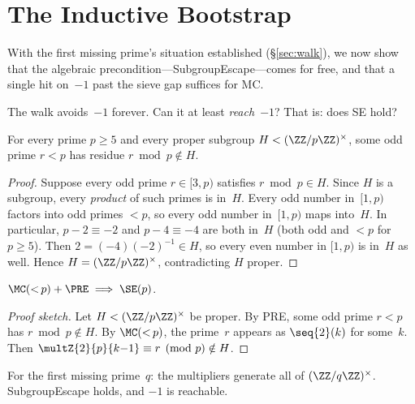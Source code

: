 \section{The Inductive Bootstrap}
\label{sec:bootstrap}

With the first missing prime's situation established (\S\ref{sec:walk}), we now show that the algebraic precondition---SubgroupEscape---comes for free, and that a single hit on~$-1$ past the sieve gap suffices for MC\@.

The walk avoids~$-1$ forever.  Can it at least \emph{reach}~$-1$?
That is: does SE hold?

\begin{theorem}\label{thm:pre}
For every prime $p \geq 5$ and every proper subgroup
$H < (\ZZ/p\ZZ)^\times$, some odd prime $r < p$ has residue
$r \bmod p \notin H$.
\end{theorem}

\begin{proof}
Suppose every odd prime $r \in [3, p)$ satisfies $r \bmod p \in H$.
Since $H$ is a subgroup, every \emph{product} of such primes is
in~$H$.  Every odd number in~$[1, p)$ factors into odd primes $< p$,
so every odd number in~$[1, p)$ maps into~$H$.  In particular,
$p - 2 \equiv -2$ and $p - 4 \equiv -4$ are both in~$H$ (both odd
and $< p$ for $p \geq 5$).  Then $2 = (-4)(-2)^{-1} \in H$, so every
even number in $[1, p)$ is in~$H$ as well.  Hence
$H = (\ZZ/p\ZZ)^\times$, contradicting $H$ proper.
\end{proof}

\begin{theorem}
\label{thm:bootstrap}
$\MC({<}\,p) + \PRE \;\Longrightarrow\; \SE(p)$.
\end{theorem}

\begin{proof}[Proof sketch]
Let $H < (\ZZ/p\ZZ)^\times$ be proper.  By PRE, some odd prime
$r < p$ has $r \bmod p \notin H$.  By $\MC({<}\,p)$, the prime~$r$
appears as $\seq{2}(k)$ for some~$k$.  Then $\multZ{2}{p}{k{-}1} \equiv r
\pmod{p} \notin H$.
\end{proof}

\begin{corollary}\label{cor:fmp-se}
For the first missing prime~$q$: the multipliers generate all of
$(\ZZ/q\ZZ)^\times$.  SubgroupEscape holds, and $-1$ is reachable.
\end{corollary}

